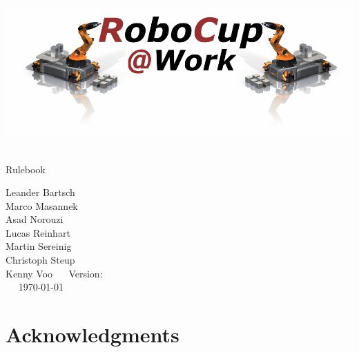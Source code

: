 
\begin{titlepage}
  \begin{center}
    {

      \includegraphics[width=\textwidth]{images/logo_RoboCupAtWork.pdf}\\[1.23ex]
    }
    \vspace{2.7 cm}
    \hrulefill\par
    {%
      \vspace*{.27cm}
      \Huge{\RCAW}\\[1.23ex]
      \Large Rulebook \\[2ex]
    }

    \hrulefill\par

    \vfill
    Leander Bartsch\\
    Marco Masannek\\
    Asad Norouzi\\
    Lucas Reinhart\\
    Martin Sereinig\\
    Christoph Steup\\
    Kenny Voo
    \vfill
    ~~ Version: \YEAR ~~ \\
    ~~  \today ~~ \\
  \end{center}

\newpage

\section*{Acknowledgments}


\end{titlepage}
